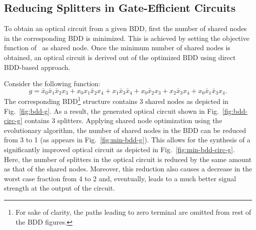 \documentclass[10pt,letterpaper,twoside,openright]{book}
\begin{document}
\subsection{Reducing Splitters in Gate-Efficient Circuits}


To obtain an optical circuit from a given BDD, first the number of shared nodes in the corresponding BDD is minimized. This is achieved by setting the objective function of~\cite{ShirinzadehSD15} as shared node.  %
Once the minimum number of shared nodes is obtained, an optical circuit is derived out of the optimized BDD using direct BDD-based approach.

\begin{example}
Consider the following function: $$g=\bar{x}_0\bar{x}_1\bar{x}_2x_3+x_0x_1\bar{x}_2x_4+x_1\bar{x}_3\bar{x}_4+x_0
\bar{x}_2x_3+x_2\bar{x}_3x_4+x_0\bar{x}_1\bar{x}_3x_4.$$ 
The corresponding BDD\footnote{For sake of clarity, the paths leading to zero terminal are omitted from rest of the BDD figures.} structure contains 3 shared nodes as depicted in Fig.~\ref{fig:bdd-g}. As a result, the generated optical circuit shown in Fig.~\ref{fig:bdd-circ-g} contains 3 splitters. Applying  shared node optimization using the evolutionary algorithm, the number of shared nodes in the BDD can be reduced from 3 to 1 (as appears in Fig.~\ref{fig:min-bdd-g}). This allows for the synthesis of a significantly improved optical  circuit as depicted in Fig.~\ref{fig:min-bdd-circ-g}. Here, the number of splitters in the optical circuit is reduced by the same amount as that of the shared nodes. Moreover, this reduction also causes a decrease in the worst case fraction from 4 to 2 and, eventually, leads to a much better signal strength at the output of the circuit.
\end{example}
\end{document}
